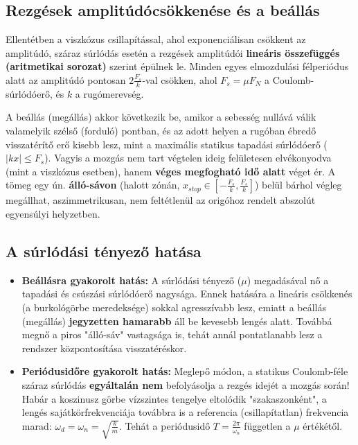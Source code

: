 \subsection*{Rezgések amplitúdócsökkenése és a beállás}
Ellentétben a viszkózus csillapítással, ahol exponenciálisan csökkent az amplitúdó, száraz súrlódás esetén a rezgések amplitúdói \textbf{lineáris összefüggés (aritmetikai sorozat)} szerint épülnek le. Minden egyes elmozdulási félperiódus alatt az amplitúdó pontosan $2\frac{F_s}{k}$-val csökken, ahol $F_s = \mu F_N$ a Coulomb-súrlódóerő, és $k$ a rugómerevség.

A beállás (megállás) akkor következik be, amikor a sebesség nullává válik valamelyik szélső (forduló) pontban, és az adott helyen a rugóban ébredő visszatérítő erő kisebb lesz, mint a maximális statikus tapadási súrlódóerő ($|k x| \le F_s$). Vagyis a mozgás nem tart végtelen ideig felületesen elvékonyodva (mint a viszkózus esetben), hanem \textbf{véges megfogható idő alatt} véget ér. A tömeg egy ún. \textbf{álló-sávon} (halott zónán, $x_{stop} \in [-\frac{F_s}{k}, \frac{F_s}{k}]$) belül bárhol végleg megállhat, aszimmetrikusan, nem feltétlenül az origóhoz rendelt abszolút egyensúlyi helyzetben.

\newpage
\subsection*{A súrlódási tényező hatása}
\begin{itemize}
    \item \textbf{Beállásra gyakorolt hatás:} A súrlódási tényező ($\mu$) megadásával nő a tapadási és csúszási súrlódóerő nagysága. Ennek hatására a lineáris csökkenés (a burkológörbe meredeksége) sokkal agresszívabb lesz, emiatt a beállás (megállás) \textbf{jegyzetten hamarabb} áll be kevesebb lengés alatt. Továbbá megnő a piros "álló-sáv" vastagsága is, tehát annál pontatlanabb lesz a rendszer központosítása visszatéréskor.
    \item \textbf{Periódusidőre gyakorolt hatás:} Meglepő módon, a statikus Coulomb-féle száraz súrlódás \textbf{egyáltalán nem} befolyásolja a rezgés idejét a mozgás során! Habár a koszinusz görbe vízszintes tengelye eltolódik "szakaszonként", a lengés sajátkörfrekvenciája továbbra is a referencia (csillapítatlan) frekvencia marad: $\omega_d = \omega_n = \sqrt{\frac{k}{m}}$. Tehát a periódusidő $T = \frac{2\pi}{\omega_n}$ független a $\mu$ értékétől.
\end{itemize}
